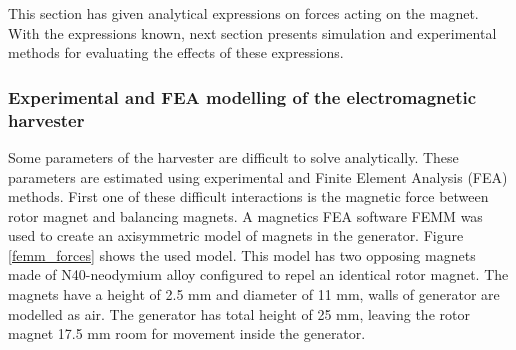 \begin{table}[htb]
\caption{\label{parameters_of_lg} Effect of the parameters of the generator.}
\begin{center}
\end{center}
\end{table}

This section has given analytical expressions on forces acting on the magnet. With the expressions known, next section presents simulation and experimental methods for evaluating the effects of these expressions.

\subsubsection{Experimental and FEA modelling of the electromagnetic harvester}
Some parameters of the harvester are difficult to solve analytically. These parameters are estimated using experimental and Finite Element Analysis (FEA) methods. First one of these difficult interactions is the magnetic force between rotor magnet and balancing magnets. A magnetics FEA software FEMM \cite{Meeker2013} was used to create an axisymmetric model of magnets in the generator. Figure \ref{femm_forces} shows the used model. This model has two opposing magnets made of N40-neodymium alloy configured to repel an identical rotor magnet. The magnets have a height of 2.5 mm and diameter of 11 mm, walls of generator are modelled as air. The generator has total height of 25 mm, leaving the rotor magnet 17.5 mm room for movement inside the generator.


